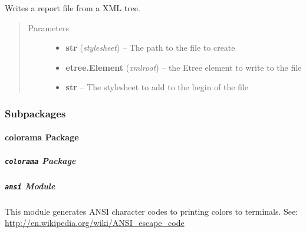 \documentclass[a4paper,10pt,english]{sphinxmanual}
\begin{document}
\begin{fulllineitems}
\label{commands/apidoc/src:src.xmlManager.write_report}
Writes a report file from a XML tree.
\begin{quote}\begin{description}
\item[{Parameters}] \leavevmode\begin{itemize}
\item {} 
\textbf{str} (\emph{stylesheet}) -- The path to the file to create

\item {} 
\textbf{etree.Element} (\emph{xmlroot}) -- the Etree element to write to the file

\item {} 
\textbf{str} -- The stylesheet to add to the begin of the file

\end{itemize}

\end{description}\end{quote}

\end{fulllineitems}



\subsubsection{Subpackages}
\label{commands/apidoc/src:subpackages}

\paragraph{colorama Package}
\label{commands/apidoc/src.colorama:colorama-package}\label{commands/apidoc/src.colorama::doc}

\subparagraph{\texttt{colorama} Package}
\label{commands/apidoc/src.colorama:id1}\label{commands/apidoc/src.colorama:module-src.colorama}

\subparagraph{\texttt{ansi} Module}
\label{commands/apidoc/src.colorama:module-src.colorama.ansi}\label{commands/apidoc/src.colorama:ansi-module}
This module generates ANSI character codes to printing colors to terminals.
See: \href{http://en.wikipedia.org/wiki/ANSI\_escape\_code}{http://en.wikipedia.org/wiki/ANSI\_escape\_code}
\end{document}
